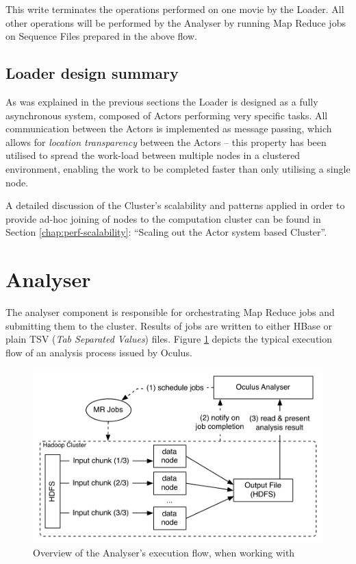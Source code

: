 This write terminates the operations performed on one movie by the Loader. All other operations will be performed by the Analyser by running Map Reduce jobs on Sequence Files prepared in the above flow.

\subsection{Loader design summary}
As was explained in the previous sections the Loader is designed as a fully asynchronous system, composed of Actors performing very specific tasks. All communication between the Actors is implemented as message passing, which allows for \textit{location transparency} between the Actors -- this property has been utilised to spread the work-load between multiple nodes in a clustered environment, enabling the work to be completed faster than only utilising a single node.

A detailed discussion of the Cluster's scalability and patterns applied in order to provide ad-hoc joining of nodes to the computation cluster can be found in Section \ref{chap:perf-scalability}: ``Scaling out the Actor system based Cluster''.

\section{Analyser}
\label{sec:analyser}
The analyser component is responsible for orchestrating Map Reduce jobs and submitting them to the cluster. Results of jobs are written to either HBase or plain TSV (\textit{Tab Separated Values}) files. Figure \ref{fig:analyser-high-level} depicts the typical execution flow of an analysis process issued by Oculus.

\begin{figure}[ch!]
  \centering
  \includegraphics[scale=0.9]{img/analyser-high-level}
  \caption{Overview of the Analyser's execution flow, when working with}
  \label{fig:analyser-high-level}
\end{figure}

